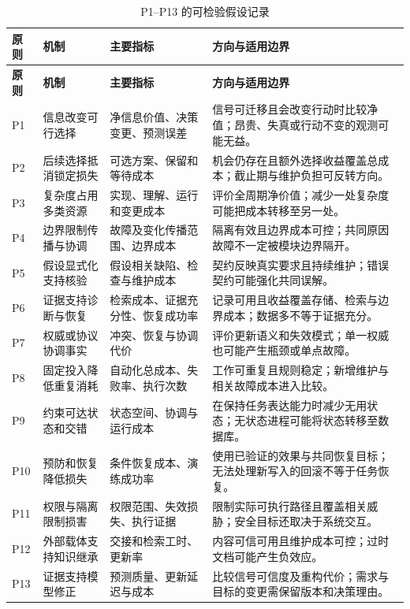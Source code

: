 \documentclass[11pt,a4paper]{ctexart}
\numberwithin{equation}{section}
\theoremstyle{definition}
\theoremstyle{plain}
\begin{document}
\small
\begin{longtable}{>{\raggedright\arraybackslash}p{}
                  >{\raggedright\arraybackslash}p{}
                  >{\raggedright\arraybackslash}p{}
                  >{\raggedright\arraybackslash}p{}}
\caption{P1--P13 的可检验假设记录}\label{tab:testable-principles}\\
\toprule
\textbf{原则} & \textbf{机制} & \textbf{主要指标} & \textbf{方向与适用边界}\\
\midrule
\endfirsthead
\toprule
\textbf{原则} & \textbf{机制} & \textbf{主要指标} & \textbf{方向与适用边界}\\
\midrule
\endhead
P1 & 信息改变可行选择 & 净信息价值、决策变更、预测误差 & 信号可迁移且会改变行动时比较净值；昂贵、失真或行动不变的观测可能无益。\\
P2 & 后续选择抵消锁定损失 & 可选方案、保留和等待成本 & 机会仍存在且额外选择收益覆盖总成本；截止期与维护负担可反转方向。\\
P3 & 复杂度占用多类资源 & 实现、理解、运行和变更成本 & 评价全周期净价值；减少一处复杂度可能把成本转移至另一处。\\
P4 & 边界限制传播与协调 & 故障及变化传播范围、边界成本 & 隔离有效且边界成本可控；共同原因故障不一定被模块边界隔开。\\
P5 & 假设显式化支持核验 & 假设相关缺陷、检查与维护成本 & 契约反映真实要求且持续维护；错误契约可能强化共同误解。\\
P6 & 证据支持诊断与恢复 & 检索成本、证据充分性、恢复成功率 & 记录可用且收益覆盖存储、检索与边界成本；数据多不等于证据充分。\\
P7 & 权威或协议协调事实 & 冲突、恢复与协调代价 & 评价更新语义和失效模式；单一权威也可能产生瓶颈或单点故障。\\
P8 & 固定投入降低重复消耗 & 自动化总成本、失败率、执行次数 & 工作可重复且规则稳定；新增维护与相关故障成本进入比较。\\
P9 & 约束可达状态和交错 & 状态空间、协调与运行成本 & 在保持任务表达能力时减少无用状态；无状态进程可能将状态转移至数据库。\\
P10 & 预防和恢复降低损失 & 条件恢复成本、演练成功率 & 使用已验证的效果与共同恢复目标；无法处理新写入的回滚不等于任务恢复。\\
P11 & 权限与隔离限制损害 & 权限范围、失效损失、执行证据 & 限制实际可执行路径且覆盖相关威胁；安全目标还取决于系统交互。\\
P12 & 外部载体支持知识继承 & 交接和检索工时、更新率 & 内容可信可用且维护成本可控；过时文档可能产生负效应。\\
P13 & 证据支持模型修正 & 预测质量、更新延迟与成本 & 比较信号可信度及重构代价；需求与目标的变更需保留版本和决策理由。\\
\bottomrule
\end{longtable}
\normalsize
\end{document}
